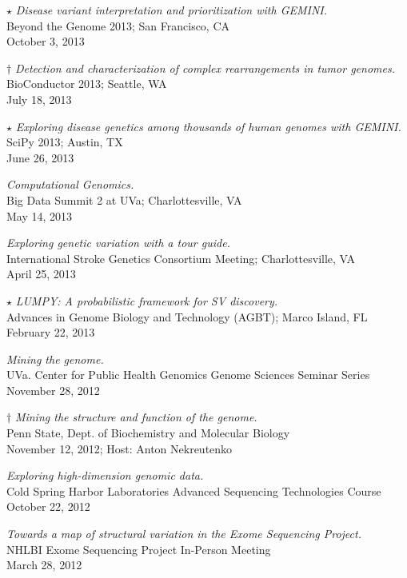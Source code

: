 \documentclass[margin,line]{cv}
\begin{document}
\begin{resume}
    $\star$ \textit{Disease variant interpretation and prioritization with GEMINI.} \\
    Beyond the Genome 2013; San Francisco, CA \\
    October 3, 2013

    $\dagger$ \textit{Detection and characterization of complex rearrangements in 
	tumor genomes.} \\
    BioConductor 2013; Seattle, WA \\
    July 18, 2013
	
    $\star$ \textit{Exploring disease genetics among thousands of human genomes 
	with GEMINI.} \\
    SciPy 2013; Austin, TX \\
    June 26, 2013
	
    \textit{Computational Genomics.} \\
    Big Data Summit 2 at UVa; Charlottesville, VA \\
    May 14, 2013
	
    \textit{Exploring genetic variation with a tour guide.} \\
    International Stroke Genetics Consortium Meeting; Charlottesville, VA \\
    April 25, 2013

    $\star$ \textit{LUMPY: A probabilistic framework for SV discovery.} \\
    Advances in Genome Biology and Technology (AGBT); Marco Island, FL \\
    February 22, 2013

    \textit{Mining the genome.} \\
    UVa. Center for Public Health Genomics Genome Sciences Seminar Series \\
    November 28, 2012
    
    $\dagger$ \textit{Mining the structure and function of the genome.} \\
    Penn State, Dept. of Biochemistry and Molecular Biology \\
    November 12, 2012; Host: Anton Nekreutenko
    
    \textit{Exploring high-dimension genomic data.} \\
    Cold Spring Harbor Laboratories Advanced Sequencing Technologies Course \\
    October 22, 2012
    
    \textit{Towards a map of structural variation in the Exome Sequencing Project.} \\
    NHLBI Exome Sequencing Project In-Person Meeting \\
    March 28, 2012


\end{resume}
\end{document}
